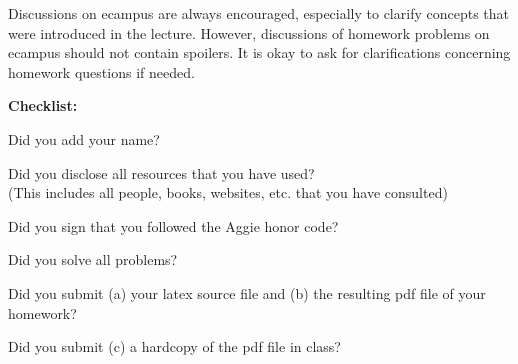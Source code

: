 \documentclass{article}
\theoremstyle{definition}
\newcommand{\checklist}{\noindent\textbf{Checklist:}
\begin{compactitem}[$\Box$] 
\item Did you add your name? 
\item Did you disclose all resources that you have used? \\
(This includes all people, books, websites, etc. that you have consulted)
\item Did you sign that you followed the Aggie honor code? 
\item Did you solve all problems? 
\item Did you submit (a) your latex source file and (b) the resulting pdf file
  of your homework?
\item Did you submit (c) a hardcopy of the pdf file in class? 
\end{compactitem}
}
\begin{document}
Discussions on ecampus are always encouraged, especially to clarify
concepts that were introduced in the lecture. However, discussions of
homework problems on ecampus should not contain spoilers. It is okay to
ask for clarifications concerning homework questions if needed. 
\medskip

\goodbreak
\checklist
\end{document}
